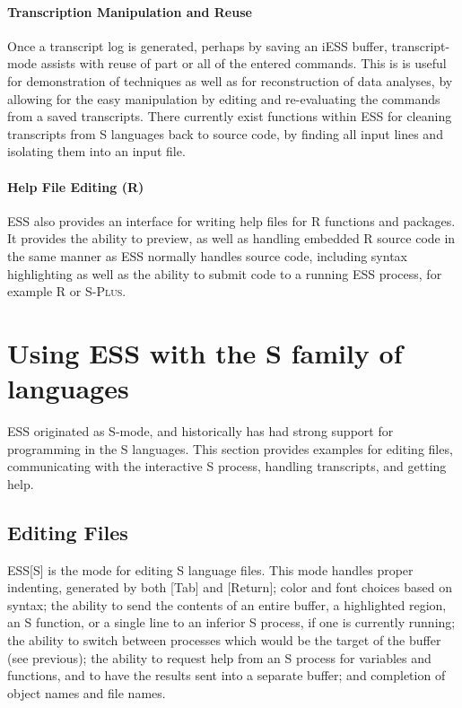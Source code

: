 \documentclass{article}
\newcommand*{\Splus}{\textsc{S-Plus}}
\begin{document}
\paragraph{Transcription Manipulation and Reuse}
Once a transcript log is generated, perhaps by saving an iESS buffer,
transcript-mode assists with reuse of part or all of the entered
commands.  This is is useful for demonstration of techniques as well
as for reconstruction of data analyses, by allowing for the easy
manipulation by editing and re-evaluating the commands from a saved
transcripts.  There currently exist functions within ESS for cleaning
transcripts from S languages back to source code, by finding all input
lines and isolating them into an input file.

\paragraph{Help File Editing (R)}
ESS also provides an interface for writing help files for R functions
and packages.  It provides the ability to preview, as well as handling
embedded R source code in the same manner as ESS normally handles
source code, including syntax highlighting as well as the ability to
submit code to a running ESS process, for example R or \Splus.

\section{Using ESS with the S family of languages}
\label{sec:S}

ESS originated as S-mode, and historically has had strong support for
programming in the S languages.  This section provides examples for
editing files, communicating with the interactive S process, handling
transcripts, and getting help.

\subsection{Editing Files}
\label{sec:S:edit}

ESS[S] is the mode for editing S language files.  This mode handles
proper indenting, generated by both [Tab] and [Return]; color and font
choices based on syntax; the ability to send the contents of an entire
buffer, a highlighted region, an S function, or a single line to an
inferior S process, if one is currently running; the ability to switch
between processes which would be the target of the buffer (see
previous); the ability to request help from an S process for variables
and functions, and to have the results sent into a separate buffer;
and completion of object names and file names.
\end{document}
